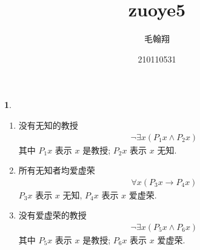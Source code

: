 \documentclass[a4paper, 12pt]{ctexbook} %
\title{zuoye5}
\author{毛翰翔 \and 210110531}
\theoremstyle{plain}
\theoremstyle{definition}
\newtheorem{problem}{}
\theoremstyle{remark}
\begin{document}
\maketitle
\begin{problem}
\begin{enumerate}
    \item 没有无知的教授
    \begin{align*}
        \neg \exists x \left(P _{1} x \wedge P_{2} x\right)
    \end{align*}
    其中 $P_{1} x$ 表示 $x$ 是教授; $P_{2} x$ 表示 $x$ 无知. 
    \item 所有无知者均爱虚荣
    \begin{align*}
        \forall  x \left(P_{3} x \to P_{4} x\right)
    \end{align*}
    $P_{3} x$ 表示 $x$ 无知, $P_{4} x$ 表示 $x$ 爱虚荣. 
    \item 没有爱虚荣的教授
    \begin{align*}
        \neg \exists x \left( P_{5}  x \wedge P_{6} x\right)
    \end{align*}
    其中 $P_{5} x    $ 表示 $x$ 是教授; $P_{6} x$ 表示 $x$ 爱虚荣.
\end{enumerate} 
\end{problem}
\end{document}
